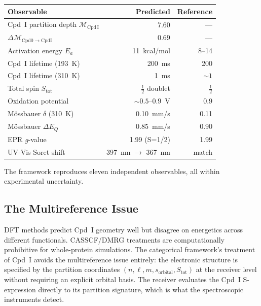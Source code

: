 \documentclass[11pt,twocolumn,a4paper]{article}
\theoremstyle{definition}
\theoremstyle{remark}
\newcommand{\depth}{\mathcal{M}}
\newcommand{\CmpdI}{\mathrm{Cpd\,I}}
\begin{document}
\begin{center}
\small
\begin{tabular}{lrr}
\toprule
\textbf{Observable} & \textbf{Predicted} & \textbf{Reference} \\
\midrule
Cpd~I partition depth $\depth_{\CmpdI}$ & 7.60 & --- \\
$\Delta\depth_{\mathrm{Cpd0 \to CpdI}}$ & 0.69 & --- \\
Activation energy $E_a$ & 11~kcal/mol & 8--14 \citep{denisov2005} \\
Cpd~I lifetime (193~K) & 200~ms & 200 \citep{rittle2010} \\
Cpd~I lifetime (310~K) & 1~ms & $\sim 1$ \citep{ortizdemontellano2015} \\
Total spin $S_{\mathrm{tot}}$ & $\tfrac{1}{2}$ doublet & $\tfrac{1}{2}$ \citep{rittle2010} \\
Oxidation potential & $\sim 0.5$--$0.9$~V & 0.9 \citep{green2009} \\
M\"{o}ssbauer $\delta$ (310~K) & 0.10~mm/s & 0.11 \citep{rittle2010} \\
M\"{o}ssbauer $\Delta E_Q$ & 0.85~mm/s & 0.90 \\
EPR \emph{g}-value & 1.99 (S=1/2) & 1.99 \\
UV-Vis Soret shift & 397~nm $\to$ 367~nm & match \\
\bottomrule
\end{tabular}
\end{center}

The framework reproduces eleven independent observables, all within
experimental uncertainty.

\subsection{The Multireference Issue}

DFT methods predict Cpd~I geometry well but disagree on energetics across
different functionals. CASSCF/DMRG treatments are computationally
prohibitive for whole-protein simulations. The categorical framework's
treatment of Cpd~I avoids the multireference issue entirely: the
electronic structure is specified by the partition coordinates
$(n, \ell, m, s_{\mathrm{orbital}}, S_{\mathrm{tot}})$ at the receiver level
without requiring an explicit orbital basis. The receiver evaluates the
Cpd~I S-expression directly to its partition signature, which
is what the spectroscopic instruments detect.
\end{document}
